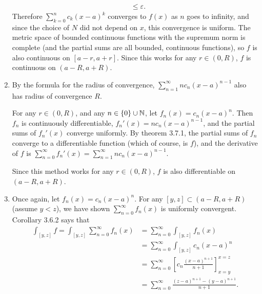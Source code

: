 \documentclass{article}
\begin{document}
\begin{enumerate}[label=(\alph*)]
\begin{align*}
                                                  &\leq \varepsilon.
        \end{align*}
        Therefore $\sum_{k=0}^n c_k (x-a)^k$ converges to $f(x)$ as $n$ goes to infinity, and since the choice of $N$ did not depend on $x$, this convergence is uniform. The metric space of bounded continuous functions with the supremum norm is complete (and the partial sums are all bounded, continuous functions), so $f$ is also continuous on $[a-r,a+r]$. Since this works for any $r \in (0,R)$, $f$ is continuous on $(a-R,a+R)$.
    \item By the formula for the radius of convergence, $\sum_{n=1}^\infty n c_n (x-a)^{n-1}$ also has radius of convergence $R$.
        \par
        For any $r \in (0, R)$, and any $n \in \left\{ 0 \right\} \cup \mathbb{N}$, let $f_n(x) = c_n (x-a)^n$. Then $f_n$ is continuously differentiable, $f_n'(x) = n c_n (x-a)^{n-1}$, and the partial sums of $f_n'(x)$ converge uniformly. By theorem 3.7.1, the partial sums of $f_n$ converge to a differentiable function (which of course, is $f$), and the derivative of $f$ is $\sum_{n=0}^\infty f_n'(x) = \sum_{n=1}^\infty n c_n (x-a)^{n-1}$.
        \par
        Since this method works for any $r \in (0, R)$, $f$ is also differentiable on $(a-R, a+R)$.
    \item Once again, let $f_n(x) = c_n (x-a)^n$. For any $[y,z] \subset (a-R,a+R)$ (assume $y < z$), we have shown $\sum_{n=0}^\infty f_n(x)$ is uniformly convergent. Corollary 3.6.2 says that
        \begin{align*}
            \int_{[y,z]} f = \int_{[y,z]} \sum_{n=0}^\infty f_n(x) &= \sum_{n=0}^\infty \int_{[y,z]} f_n(x) \\
                                                  &= \sum_{n=0}^\infty \int_{[y,z]} c_n (x-a)^n \\
                                                  &= \sum_{n=0}^\infty \left[ c_n \frac{(x-a)^{n+1}}{n+1} \right]_{x=y}^{x=z} \\
                                                  &= \sum_{n=0}^\infty \frac{(z-a)^{n+1}-(y-a)^{n+1}}{n+1}.
        \end{align*}
\end{enumerate}
\end{document}
